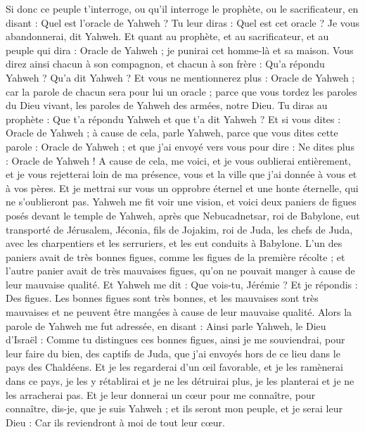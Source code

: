 \begin{multicols}{2}
Si donc ce peuple t'interroge, ou qu'il interroge le prophète, ou le sacrificateur, en disant : Quel est l'oracle de Yahweh ? Tu leur diras : Quel est cet oracle ? Je vous abandonnerai, dit Yahweh.
Et quant au prophète, et au sacrificateur, et au peuple qui dira : Oracle de Yahweh ; je punirai cet homme-là et sa maison.
Vous direz ainsi chacun à son compagnon, et chacun à son frère : Qu'a répondu Yahweh ? Qu'a dit Yahweh ?
Et vous ne mentionnerez plus : Oracle de Yahweh ; car la parole de chacun sera pour lui un oracle ; parce que vous tordez les paroles du Dieu vivant, les paroles de Yahweh des armées, notre Dieu.
Tu diras au prophète : Que t'a répondu Yahweh et que t'a dit Yahweh ?
Et si vous dites : Oracle de Yahweh ; à cause de cela, parle Yahweh, parce que vous dites cette parole : Oracle de Yahweh ; et que j'ai envoyé vers vous pour dire : Ne dites plus : Oracle de Yahweh !
A cause de cela, me voici, et je vous oublierai entièrement, et je vous rejetterai loin de ma présence, vous et la ville que j'ai donnée à vous et à vos pères.
Et je mettrai sur vous un opprobre éternel et une honte éternelle, qui ne s'oublieront pas.
\VerseOne{}Yahweh me fit voir une vision, et voici deux paniers de figues posés devant le temple de Yahweh, après que Nebucadnetsar, roi de Babylone, eut transporté de Jérusalem, Jéconia, fils de Jojakim, roi de Juda, les chefs de Juda, avec les charpentiers et les serruriers, et les eut conduits à Babylone.
L'un des paniers avait de très bonnes figues, comme les figues de la première récolte ; et l'autre panier avait de très mauvaises figues, qu'on ne pouvait manger à cause de leur mauvaise qualité.
Et Yahweh me dit : Que vois-tu, Jérémie ? Et je répondis : Des figues. Les bonnes figues sont très bonnes, et les mauvaises sont très mauvaises et ne peuvent être mangées à cause de leur mauvaise qualité.
Alors la parole de Yahweh me fut adressée, en disant :
Ainsi parle Yahweh, le Dieu d'Israël : Comme tu distingues ces bonnes figues, ainsi je me souviendrai, pour leur faire du bien, des captifs de Juda, que j'ai envoyés hors de ce lieu dans le pays des Chaldéens.
Et je les regarderai d'un œil favorable, et je les ramènerai dans ce pays, je les y rétablirai et je ne les détruirai plus, je les planterai et je ne les arracherai pas.
Et je leur donnerai un cœur pour me connaître, pour connaître, dis-je, que je suis Yahweh ; et ils seront mon peuple, et je serai leur Dieu : Car ils reviendront à moi de tout leur cœur.

\end{multicols}
